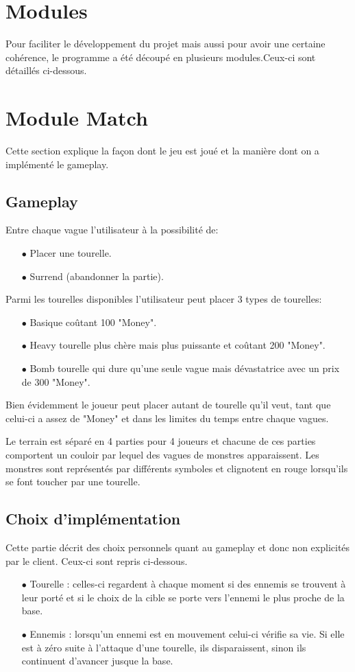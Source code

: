\documentclass[12pt,a4paper]{article}
\begin{document}
\newpage
\section{Modules}
Pour faciliter le développement du projet mais aussi pour avoir une certaine cohérence, le programme a été découpé en plusieurs modules.Ceux-ci sont détaillés ci-dessous.
\section{Module Match}
Cette section explique la façon dont le jeu est joué et la manière dont on a implémenté le gameplay.
\subsection{Gameplay}
Entre chaque vague l'utilisateur  à la possibilité de:
\begin{itemize}
    \item[$\bullet$] Placer une tourelle.
    \item[$\bullet$] Surrend (abandonner la partie).
\end{itemize}
Parmi les tourelles disponibles l'utilisateur  peut placer 3 types de tourelles:
\begin{itemize}
    \item[$\bullet$] Basique coûtant 100 "Money".
    \item[$\bullet$] Heavy tourelle plus chère mais plus puissante et coûtant 200 "Money".
    \item[$\bullet$] Bomb tourelle qui dure qu'une seule vague mais dévastatrice avec un prix de 300 "Money".
\end{itemize}
Bien évidemment le joueur peut placer autant de tourelle qu'il veut, tant que celui-ci a assez de "Money" et dans les limites du temps entre chaque vagues.
\bigskip
\par
Le terrain est séparé en 4 parties pour 4 joueurs et chacune de ces parties comportent un couloir par lequel des vagues de monstres apparaissent.
Les monstres sont représentés par différents symboles et clignotent en rouge lorsqu'ils se font toucher par une tourelle.
\subsection{Choix d'implémentation}
Cette partie décrit des choix personnels quant au gameplay et donc non explicités par le client. Ceux-ci sont repris ci-dessous.
\begin{itemize}
\item[$\bullet$] Tourelle : celles-ci regardent à chaque moment si des ennemis se trouvent à leur porté et si le choix de la cible se porte vers l'ennemi le plus proche de la base.
\item[$\bullet$] Ennemis : lorsqu'un ennemi est en mouvement celui-ci vérifie sa vie. Si elle est à zéro suite à l'attaque d'une tourelle, ils disparaissent, sinon ils continuent d'avancer jusque la base.
\end{itemize}
\newpage
\end{document}
